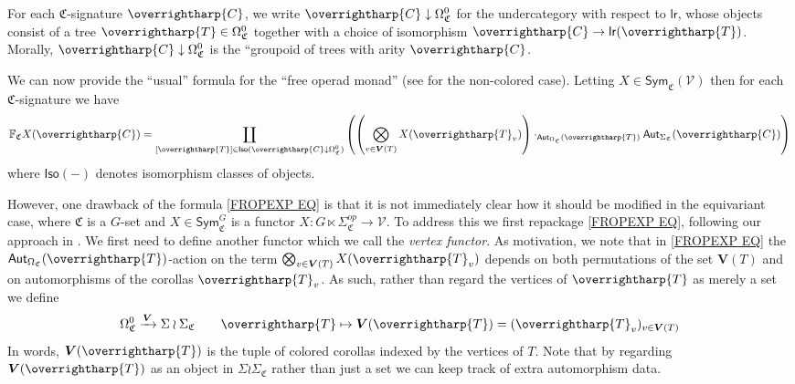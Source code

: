 \documentclass[a4paper,10pt
,draft
]{article}%
\numberwithin{equation}{section}
\numberwithin{figure}{section}
\theoremstyle{definition} %
\newcommand{\vect}[1]{\text{\overrightharp{\ensuremath{#1}}}}
\newcommand{\V}{\ensuremath{\mathcal V}}
\newcommand{\1}{\ensuremath{\mathbbm 1}}%
\begin{document}
For each $\mathfrak{C}$-signature $\vect{C}$,
we write $\vect{C} \downarrow \Omega_{\mathfrak{C}}^0$
for the undercategory with respect to $\mathsf{lr}$, 
whose objects consist of a tree $\vect{T}\in \Omega_{\mathfrak{C}}^0$
together with a choice of isomorphism 
$\vect{C} \to \mathsf{lr}(\vect{T})$.
Morally, $\vect{C} \downarrow \Omega_{\mathfrak{C}}^0$
is the ``groupoid of trees with arity $\vect{C}$. 

We can now provide the ``usual'' formula for the ``free operad monad''
(see \cite[page 816]{BM07} for the non-colored case).
Letting 
$X \in \mathsf{Sym}_{\mathfrak{C}}(\V)$
then for each $\mathfrak{C}$-signature we have
\begin{equation}\label{FROPEXP EQ}
\mathbb{F}_{\mathfrak{C}} X (\vect{C})
=
\coprod_{[\vect{T}] \in 
\mathsf{Iso}(\vect{C} \downarrow \Omega^0_{\mathfrak{C}})}
\left(
\left(
\bigotimes_{v \in \boldsymbol{V}(T)} X(\vect{T}_v)
\right)
\cdot_{\mathsf{Aut}_{\Omega_{\mathfrak{C}}}(\vect{T})}
\mathsf{Aut}_{\Sigma_{\mathfrak{C}}}(\vect{C})
\right)
\end{equation}
where $\mathsf{Iso}(-)$ denotes isomorphism classes of objects.

However, one drawback of the formula  
\eqref{FROPEXP EQ}
is that it is not immediately clear how it should be modified 
in the equivariant case,
where $\mathfrak{C}$ is a $G$-set
and $X \in \mathsf{Sym}^G_{\mathfrak{C}}$
is a functor 
$X \colon G \ltimes \Sigma_{\mathfrak{C}}^{op} \to \V$.
To address this we first repackage \eqref{FROPEXP EQ}, 
following our approach in \cite[\S 4]{BP_geo}.
We first need to define another functor which we call the \emph{vertex functor}.
As motivation, we note that
in \eqref{FROPEXP EQ}
the $\mathsf{Aut}_{\Omega_{\mathfrak{C}}}(\vect{T})$-action
on the term
$\bigotimes_{v \in \boldsymbol{V}(T)} X(\vect{T}_v)$
depends on both permutations 
of the set $\boldsymbol{V}(T)$
and on automorphisms of the corollas $\vect{T}_v$.
As such, rather than regard the vertices of $\vect{T}$ as merely a set
we define 
\begin{equation}\label{VFUNDEF EQ}
\Omega_{\mathfrak{C}}^0 \xrightarrow{\boldsymbol{V}} \Sigma \wr \Sigma_{\mathfrak{C}}
\qquad 
\vect{T} \mapsto 
\boldsymbol{V}(\vect{T})=(\vect{T}_v )_{v \in \boldsymbol{V}(T)}
\end{equation}
In words, $\boldsymbol{V}(\vect{T})$
is the tuple of colored corollas indexed by the vertices of $T$. 
Note that
by regarding $\boldsymbol{V}(\vect{T})$ as an object in 
$\Sigma \wr \Sigma_{\mathfrak{C}}$ rather than just a set we can keep track of extra automorphism data.
\end{document}
